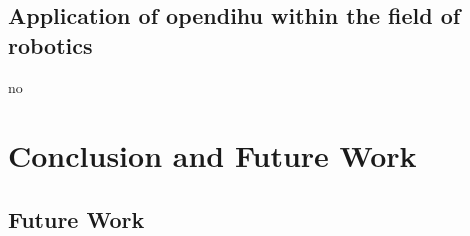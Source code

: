 \section{Application of opendihu within the field of robotics} 
no

\chapter{Conclusion and Future Work}\label{sec:conclusion_and_future_work}

\section{Future Work}\label{sec:future_work}
 



